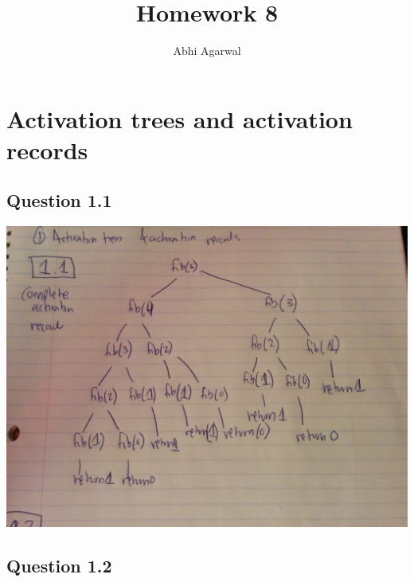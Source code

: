 \documentclass[11pt, oneside]{article}   	%
\title{Homework 8}
\author{Abhi Agarwal}
\date{}
\begin{document}
\maketitle

\section{Activation trees and activation records}

\subsection{Question 1.1}
\includegraphics[scale=0.15]{IMG_20141031_203503.jpg}

\subsection{Question 1.2}
\end{document}
